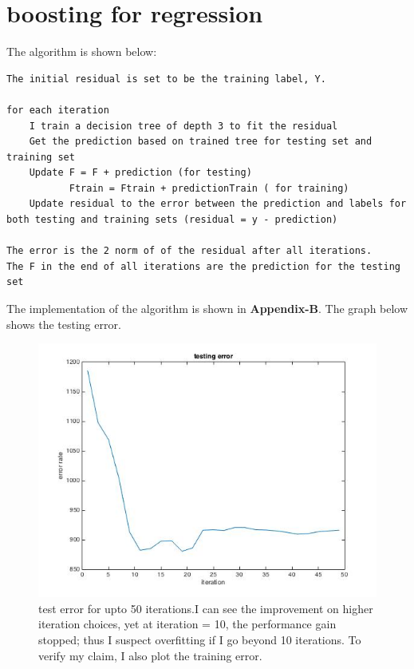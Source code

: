 \documentclass[twoside]{article}
\theoremstyle{definition}
\theoremstyle{definition}
\theoremstyle{remark}
\begin{document}
\section{boosting for regression}
The algorithm is shown below:
\begin {verbatim} 
The initial residual is set to be the training label, Y. 

for each iteration
    I train a decision tree of depth 3 to fit the residual
    Get the prediction based on trained tree for testing set and training set
    Update F = F + prediction (for testing)
           Ftrain = Ftrain + predictionTrain ( for training)
    Update residual to the error between the prediction and labels for both testing and training sets (residual = y - prediction)

The error is the 2 norm of of the residual after all iterations.
The F in the end of all iterations are the prediction for the testing set
\end{verbatim}

The implementation of the algorithm is shown in \textbf{Appendix-B}. The graph below shows the testing error. 
\begin{figure}[H]
\centering
\includegraphics[width=120mm]{problem2_1.jpg}
\caption{test error for upto 50 iterations.I can see the improvement on higher iteration choices, yet at iteration = 10, the performance gain stopped; thus I suspect overfitting if I go beyond 10 iterations. To verify my claim, I also plot the training error. }
\end{figure}
\end{document}
